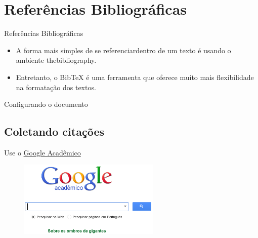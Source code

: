 \section{Referências Bibliográficas}

\begin{frame}{Referências Bibliográficas}
\begin{itemize}
 \item A forma mais simples de se referenciardentro de um texto é usando o ambiente {\ttfamily thebibliography}.
\item Entretanto, o Bib\TeX{} é uma ferramenta que oferece muito mais flexibilidade na formatação dos textos.
\end{itemize}
\end{frame}

\begin{frame}{Configurando o documento}

\end{frame}

\subsection*{Coletando citações}

\begin{frame}{Use o \href{http://scholar.google.com.br}{Google Acadêmico}}
	
\begin{figure}[htbp!]
	\centering
	\includegraphics[width=0.6\textwidth]{figuras/google1.png}
	\caption{ }
\end{figure}
\end{frame}

